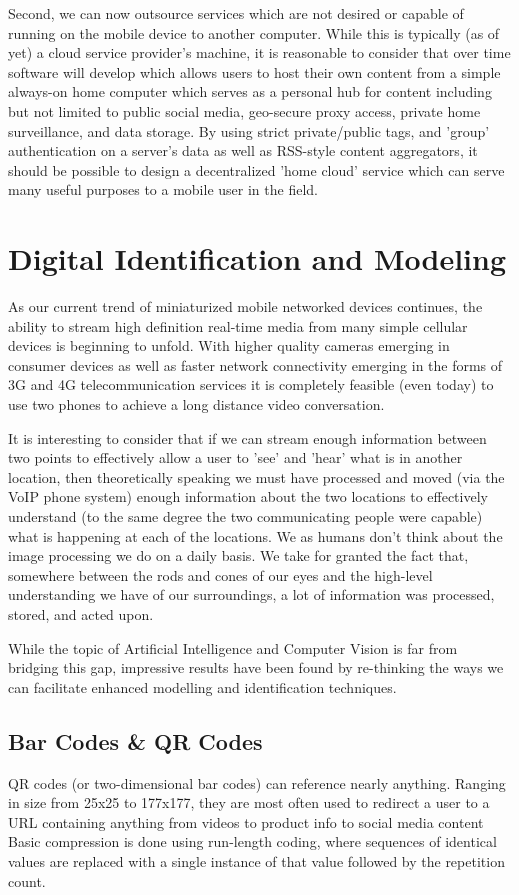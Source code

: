 \documentclass[a4paper,12pt]{report}
\begin{document}
Second, we can now outsource services which are not desired or capable of running on the mobile device to another computer. While this is typically (as of yet) a cloud service provider's machine, it is reasonable to consider that over time software will develop which allows users to host their own content from a simple always-on home computer which serves as a personal hub for content including but not limited to public social media, geo-secure proxy access, private home surveillance, and data storage. By using strict private/public tags, and 'group' authentication on a server's data as well as RSS-style content aggregators, it should be possible to design a decentralized 'home cloud' service which can serve many useful purposes to a mobile user in the field.

\section{Digital Identification and Modeling}

As our current trend of miniaturized mobile networked devices continues, the ability to stream high definition real-time media from many simple cellular devices is beginning to unfold. With higher quality cameras emerging in consumer devices as well as faster network connectivity emerging in the forms of 3G and 4G telecommunication services it is completely feasible (even today) to use two phones to achieve a long distance video conversation.

It is interesting to consider that if we can stream enough information between two points to effectively allow a user to 'see' and 'hear' what is in another location, then theoretically speaking we must have processed and moved (via the VoIP phone system) enough information about the two locations to effectively understand (to the same degree the two communicating people were capable) what is happening at each of the locations. We as humans don't think about the image processing we do on a daily basis. We take for granted the fact that, somewhere between the rods and cones of our eyes and the high-level understanding we have of our surroundings, a lot of information was processed, stored, and acted upon.

While the topic of Artificial Intelligence and Computer Vision is far from bridging this gap, impressive results have been found by re-thinking the ways we can facilitate enhanced modelling and identification techniques.

\subsection{Bar Codes \& QR Codes}
QR codes (or two-dimensional bar codes) can reference nearly anything. Ranging in size from 25x25 to 177x177, they are most often used to redirect a user to a URL containing anything from videos to product info to social media content \cite{6182398}
Basic compression is done using run-length coding, where sequences of identical values are replaced with a single instance of that value followed by the repetition count. \cite{6182398}
\end{document}
